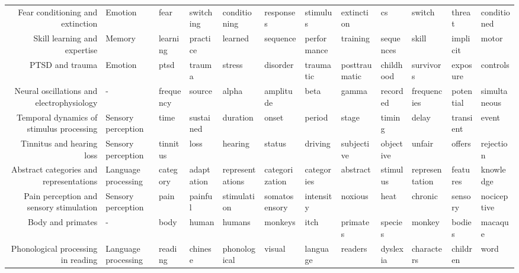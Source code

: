 \documentclass[english]{article}
\begin{document}
\begin{landscape}
\begin{center}
\begin{supertabular}{rlllllllllll}
    Fear conditioning and extinction &             Emotion &             fear &     switching &    conditioning &      responses &    stimulus &     extinction &            cs &         switch &        threat &    conditioned \\
        Skill learning and expertise &              Memory &         learning &      practice &         learned &       sequence & performance &       training &     sequences &          skill &      implicit &          motor \\
                     PTSD and trauma &             Emotion &             ptsd &        trauma &          stress &       disorder &   traumatic &  posttraumatic &     childhood &      survivors &      exposure &       controls \\
Neural oscillations and electrophysiology &                   - &        frequency &        source &           alpha &      amplitude &        beta &          gamma &      recorded &    frequencies &     potential &   simultaneous \\
Temporal dynamics of stimulus processing &  Sensory perception &             time &     sustained &        duration &          onset &      period &          stage &        timing &          delay &     transient &          event \\
           Tinnitus and hearing loss &  Sensory perception &         tinnitus &          loss &         hearing &         status &     driving &     subjective &     objective &         unfair &        offers &      rejection \\
Abstract categories and representations & Language processing &         category &    adaptation & representations & categorization &  categories &       abstract &      stimulus & representation &      features &      knowledge \\
Pain perception and sensory stimulation &  Sensory perception &             pain &       painful &     stimulation &  somatosensory &   intensity &        noxious &          heat &        chronic &       sensory &    nociceptive \\
                   Body and primates &                   - &             body &         human &          humans &        monkeys &        itch &       primates &       species &         monkey &        bodies &        macaque \\
  Phonological processing in reading & Language processing &          reading &       chinese &    phonological &         visual &    language &        readers &      dyslexia &     characters &      children &           word \\

\end{supertabular}
\end{center}
\end{landscape}
\end{document}
